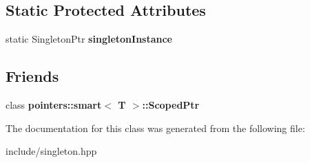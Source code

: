\subsection*{Static Protected Attributes}
\begin{DoxyCompactItemize}
\item 
\hypertarget{classcore_1_1_singleton_a2c3d8c5c0296b044aee68f33392f657e}{static Singleton\-Ptr {\bfseries singleton\-Instance}}\label{classcore_1_1_singleton_a2c3d8c5c0296b044aee68f33392f657e}

\end{DoxyCompactItemize}
\subsection*{Friends}
\begin{DoxyCompactItemize}
\item 
\hypertarget{classcore_1_1_singleton_ac08a890203699aa0e321b1e8b3270136}{class {\bfseries pointers\-::smart$<$ T $>$\-::\-Scoped\-Ptr}}\label{classcore_1_1_singleton_ac08a890203699aa0e321b1e8b3270136}

\end{DoxyCompactItemize}


The documentation for this class was generated from the following file\-:\begin{DoxyCompactItemize}
\item 
include/singleton.\-hpp\end{DoxyCompactItemize}

